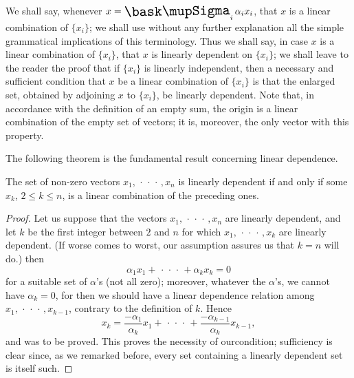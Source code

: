 We shall say, whenever \(x = \sumx_i \alpha_i x_i\), that \(x\) is a linear
combination of \(\{x_i\}\); we shall use without any further explanation all the
simple grammatical implications of this terminology. Thus we shall say, in case
\(x\) is a linear combination of \(\{x_i\}\), that \(x\) is linearly dependent
on \(\{x_i\}\); we shall leave to the reader the proof that if \(\{x_i\}\) is
linearly independent, then a necessary and sufficient condition that \(x\) be a
linear combination of \(\{x_i\}\) is that the enlarged set, obtained by
adjoining \(x\) to \(\{x_i\}\), be linearly dependent. Note that, in accordance
with the definition of an empty sum, the origin is a linear combination of the
empty set of vectors; it is, moreover, the only vector with this property.

The following theorem is the fundamental result concerning linear dependence.

\begin{thmx}
    The set of non-zero vectors \(x_1,\,\cdot\,\cdot\,\cdot\,,x_n\) is linearly dependent if and only if some \(x_k\), \(2\leq k\leq n\), is a linear combination of the preceding ones.
\end{thmx}

\begin{proof}
    Let us suppose that the vectors \(x_1, \,\cdot\,\cdot\,\cdot\,, x_n\) are linearly dependent,
    and let \(k\) be the first integer between \(2\) and \(n\) for which \(x_1,
    \,\cdot\,\cdot\,\cdot\,, x_k\) are linearly dependent. (If worse comes to worst, our
    assumption assures us that \(k = n\) will do.) then
    \begin{equation*}
        \alpha_1 x_1 + \,\cdot\,\cdot\,\cdot\, + \alpha_k x_k = 0
    \end{equation*}
    for a suitable set of \(\alpha\)'s (not all zero); moreover, whatever the
    \(\alpha\)'s, we cannot have \(\alpha_k = 0\), for then we should have a
    linear dependence relation among \(x_1, \,\cdot\,\cdot\,\cdot\,, x_{k-1}\), contrary to the
    definition of \(k\). Hence
    \begin{equation*}
        x_k = \frac{-\alpha_1}{\alpha_k} x_1 + \,\cdot\,\cdot\,\cdot\, + \frac{-\alpha_{k-1}}{\alpha_k} x_{k-1},
    \end{equation*}
    and was to be proved. This proves the necessity of ourcondition; sufficiency
    is clear since, as we remarked before, every set containing a linearly
    dependent set is itself such.
\end{proof}


